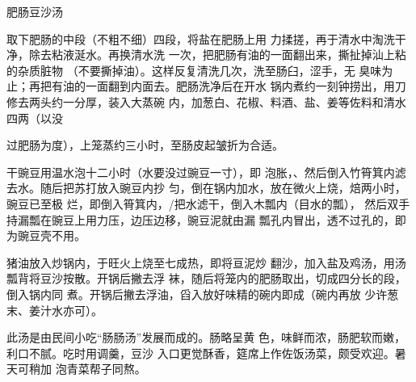 \begin{recipe}{肥肠豆沙汤}

\ingredients




\cooking

\step 取下肥肠的中段（不粗不细）四段，将盐在肥肠上用 力揉搓，再于清水中淘洗干净，除去粘液涎水。再换清水洗 一次，把肥肠有油的一面翻出来，撕扯掉汕上粘的杂质脏物 （不要撕掉油）。这样反复清洗几次，洗至肠臼，涩手，无 臭味为止；再把有油的一面翻到内面去。肥肠洗净后在开水 锅内煮约一刻钟捞出，用刀修去两头约一分厚，装入大蒸碗 内，加葱白、花椒、料酒、盐、姜等佐料和清水四两（以没

过肥肠为度），上笼蒸约三小时，至肠皮起皱折为合适。

\step 干豌豆用温水泡十二小时（水要没过豌豆一寸），即 泡胀，、然后倒入竹筲箕内滤去水。随后把苏打放入豌豆内抄 匀，倒在锅内加水，放在微火上烧，焙两小时，豌豆已至极 烂，即倒入筲箕内，/把水滤干，倒入木瓢内（目水的瓢）， 然后双手持漏瓢在豌豆上用力压，边压边移，豌豆泥就由漏 瓢孔内冒出，透不过孔的，即为豌豆壳不用。

\step 猪油放入炒锅内，于旺火上烧至七成热，即将亘泥炒 翻沙，加入盐及鸡汤，用汤瓢背将豆沙按散。开锅后撇去浮 袜，随后将笼内的肥肠取出，切成四分长的段，倒入锅内同 煮。开锅后撇去浮油，舀入放好味精的碗内即成（碗内再放 少许葱末、姜汁水亦可）。

\notes

此汤是由民间小吃“肠肠汤”发展而成的。肠略呈黄 色，味鲜而浓，肠肥软而嫩，利口不腻。吃时用调羹，豆沙 入口更觉酥香，筵席上作佐饭汤菜，颇受欢迎。暑天可稍加 泡青菜帮子同熬。

\end{recipe}

